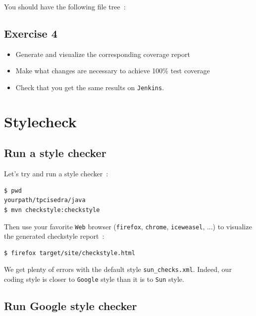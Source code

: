 \documentclass{article}
\begin{document}
You should have the following file tree~:\\
{\centering\small
            \begin{minipage}[t]{0.3\linewidth}
\end{minipage}
}

\subsection{Exercise 4}
\begin{itemize}
\item Generate and visualize the corresponding coverage report
\item Make what changes are necessary to achieve 100\% test coverage
\item Check that you get the same results on \texttt{Jenkins}.
\end{itemize}

\section{Stylecheck}

\subsection{Run a style checker}

Let's try and run a style checker~:
\begin{lstlisting}
$ pwd
yourpath/tpcisedra/java
$ mvn checkstyle:checkstyle
\end{lstlisting}

Then use your favorite \texttt{Web} browser (\texttt{firefox}, \texttt{chrome}, \texttt{iceweasel}, ...) to visualize the generated checkstyle report~:
\begin{lstlisting}
$ firefox target/site/checkstyle.html
\end{lstlisting}

We get plenty of errors with the default style \texttt{sun\_checks.xml}.
Indeed, our coding style is closer to \texttt{Google} style than it is to \texttt{Sun} style.

\subsection{Run Google style checker}
\end{document}
